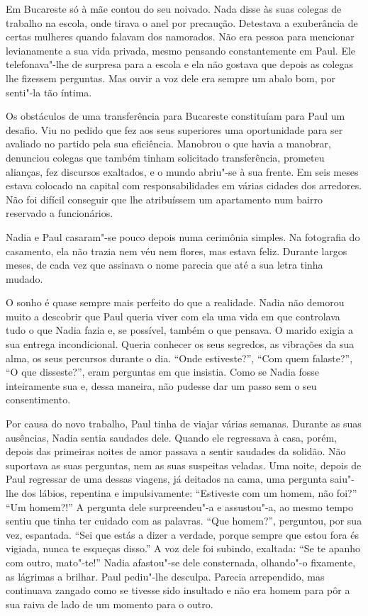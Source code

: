 Em Bucareste só à mãe contou do seu
noivado. Nada disse às suas colegas de trabalho na escola, onde tirava o
anel por precaução. Detestava a exuberância de certas mulheres quando
falavam dos namorados. Não era pessoa para mencionar levianamente a sua
vida privada, mesmo pensando constantemente em Paul. Ele telefonava"-lhe
de surpresa para a escola e ela não gostava que depois as colegas lhe
fizessem perguntas. Mas ouvir a voz dele era
sempre um abalo bom, por senti"-la tão íntima.

Os obstáculos de uma transferência para Bucareste constituíam para Paul
um desafio. Viu no pedido que fez
aos seus superiores uma oportunidade para ser avaliado no partido pela
sua eficiência. Manobrou o que havia a manobrar, denunciou colegas que
também tinham solicitado transferência, prometeu alianças, fez
discursos exaltados, e o mundo abriu"-se à sua frente. Em seis meses
estava colocado na capital com responsabilidades em várias cidades dos
arredores. Não foi difícil conseguir que lhe atribuíssem um apartamento
num bairro reservado a funcionários.

Nadia e Paul casaram"-se pouco depois numa cerimônia simples. Na
fotografia do casamento, ela não trazia nem véu nem flores, mas estava
feliz. Durante largos meses, de cada vez que assinava o nome parecia que
até a sua letra tinha mudado.

O sonho é quase sempre mais perfeito do que a realidade. Nadia não
demorou muito a descobrir que Paul queria viver com ela uma vida em que
controlava tudo o que Nadia fazia e, se possível, também o que pensava.
O marido exigia a sua entrega incondicional. Queria conhecer os seus
segredos, as vibrações da sua alma, os seus percursos durante o dia.
``Onde estiveste?'', ``Com quem falaste?'', ``O que disseste?'', eram
perguntas em que insistia. Como se Nadia fosse inteiramente sua e,
dessa maneira, não pudesse dar um passo sem o seu consentimento.

Por causa do novo trabalho, Paul tinha de viajar várias semanas. Durante
as suas ausências, Nadia sentia saudades dele. Quando ele regressava à
casa, porém, depois das primeiras noites de amor passava a sentir
saudades da solidão. Não suportava as suas perguntas, nem as suas
suspeitas veladas. Uma noite, depois de Paul regressar de
uma dessas viagens, já deitados na cama, uma pergunta saiu"-lhe dos
lábios, repentina e impulsivamente: ``Estiveste com um homem, não foi?''
``Um homem?!'' A pergunta dele surpreendeu"-a e assustou"-a, ao mesmo tempo
sentiu que tinha ter cuidado com as palavras. ``Que homem?'', perguntou,
por sua vez, espantada. ``Sei que estás a dizer a verdade, porque sempre
que estou fora és vigiada, nunca te esqueças disso.'' A voz dele foi
subindo, exaltada: ``Se te apanho com outro, mato"-te!'' Nadia afastou"-se
dele consternada, olhando"-o fixamente, as lágrimas a brilhar. Paul
pediu"-lhe desculpa. Parecia arrependido, mas continuava zangado como se
tivesse sido insultado e não era homem para pôr a sua raiva de lado de
um momento para o outro.

